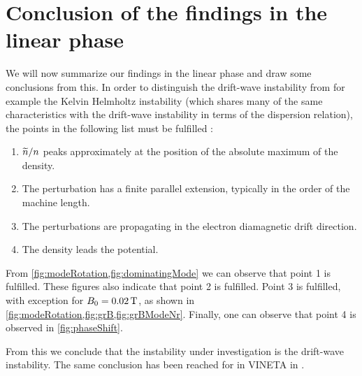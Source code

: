 \section{Conclusion of the findings in the linear phase}
%
We will now summarize our findings in the linear phase and draw some conclusions from this.
In order to distinguish the drift-wave instability from for example the Kelvin Helmholtz instability (which shares many of the same characteristics with the drift-wave instability in terms of the dispersion relation), the points in the following list must be fulfilled \cite{Jassby1972,Hendel1968}:
%
\begin{enumerate}[noitemsep]
    \item $\widetilde{ n}/n$ peaks approximately at the position of the absolute maximum of the density.
    \item The perturbation has a finite parallel extension, typically in the order of the machine length.
    \item The perturbations are propagating in the electron diamagnetic drift direction.
    \item The density leads the potential.
\end{enumerate}
%
From \cref{fig:modeRotation,fig:dominatingMode} we can observe that point 1 is fulfilled.
These figures also indicate that point 2 is fulfilled.
Point 3 is fulfilled, with exception for $B_0=0.02\, \text{T}$, as shown in \cref{fig:modeRotation,fig:grB,fig:grBModeNr}.
Finally, one can observe that point 4 is observed in \cref{fig:phaseShift}.

From this we conclude that the instability under investigation is the drift-wave instability.
The same conclusion has been reached for in VINETA in \cite{Schroder2005}.
